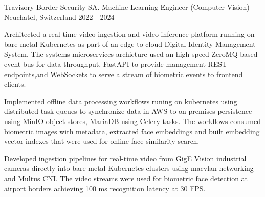 

\begin{cventries}

\cventry
{Travizory Border Security SA.} %
{Machine Learning Engineer (Computer Vision)} %
{Neuchatel, Switzerland} %
{2022 - 2024} %
{
  \begin{cvitems} %
    \item {
    Architected a real-time video ingestion and video inference platform running on 
    bare-metal Kubernetes as part of an edge-to-cloud Digital Identity Management 
    System. The systems microservices archicture used an high speed ZeroMQ based event bus for data 
    throughput, FastAPI to provide management REST endpoints,and WebSockets to 
    serve a stream of biometric events to frontend clients.}
    \item {
    Implemented offline data processing workflows runing on kubernetes using 
    distributed task queues to synchronize data in AWS 
    to on-premises persistence using MinIO object stores, MariaDB using Celery tasks. 
    The workflows consumed biometric images with metadata, extracted face embeddings and built 
    embedding vector indexes that were used for online face similarity search.}
    \item {
    Developed ingestion pipelines for real-time video from GigE Vision industrial cameras 
    directly into bare-metal Kubernetes clusters using macvlan networking and Multus CNI. 
    The video streams were used for biometric face detection at airport borders achieving 
    100 ms recognition latency at 30 FPS.}
  \end{cvitems}
}


\end{cventries}
